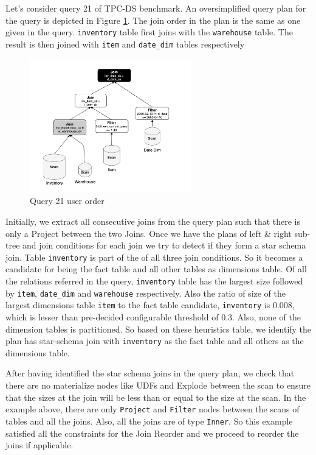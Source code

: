 Let's consider query 21 of TPC-DS benchmark. An oversimplified query plan for the query is depicted in Figure \ref{without-reorder}. The join order in the plan is the same as one given in the query. \texttt{inventory} table first joins with the \texttt{warehouse} table. The result is then joined with \texttt{item} and \texttt{date\_dim} tables respectively

\begin{figure}[ht]
\centerline{\includegraphics[width=7cm]{fig/without-reorder.png}}
\caption{Query 21 user order}
\label{without-reorder}
\end{figure}

Initially, we extract all consecutive joins from the query plan such that there is only a Project between the two Joins. Once we have the plans of left & right sub-tree and join conditions for each join we try to detect if they form a star schema join. Table \texttt{inventory} is part of the of all three join conditions. So it becomes a candidate for being the fact table and all other tables as dimensions table. Of all the relations referred in the query, \texttt{inventory} table has the largest size followed by \texttt{item}, \texttt{date\_dim} and \texttt{warehouse} respectively. Also the ratio of size of the largest dimensions table \texttt{item} to the fact table candidate, \texttt{inventory} is 0.008, which is lesser than pre-decided configurable threshold of 0.3. Also, none of the dimension tables is partitioned. So based on these heuristics table, we identify the plan has star-schema join with \texttt{inventory} as the fact table and all others as the dimensions table.

After having identified the star schema joins in the query plan, we check that there are no materialize nodes like UDFs and Explode between the scan to ensure that the sizes at the join will be less than or equal to the size at the scan. In the example above, there are only \texttt{Project} and \texttt{Filter} nodes between the scans of tables and all the joins. Also, all the joins are of type \texttt{Inner}. So this example satisfied all the constraints for the Join Reorder and we proceed to reorder the joins if applicable.

